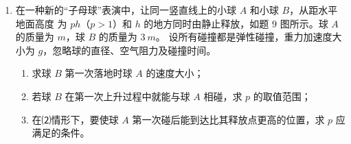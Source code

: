 \begin{enumerate}


\newpage
\item 
{}
在一种新的“子母球”表演中，让同一竖直线上的小球 $ A $ 和小球 $ B $，从距水平地面高度
为 $ ph $（$ p > 1 $）和 $ h $ 的地方同时由静止释放，如题 $ 9 $ 图所示。球 $ A $ 的质量为 $ m $，球 $ B $ 的质量为 $ 3 \ m $。
设所有碰撞都是弹性碰撞，重力加速度大小为 $ g $，忽略球的直径、空气阻力及碰撞时间。
\begin{enumerate}
\renewcommand{\labelenumi}{\arabic{enumi}.}
\item
求球 $ B $ 第一次落地时球 $ A $ 的速度大小；

\item 
若球 $ B $ 在第一次上升过程中就能与球 $ A $ 相碰，求 $ p $ 的取值范围；
\item 
在⑵情形下，要使球 $ A $ 第一次碰后能到达比其释放点更高的位置，求
$ p $ 应满足的条件。



\end{enumerate}
\begin{figure}[h!]
\flushright

\end{figure}

\end{enumerate}
